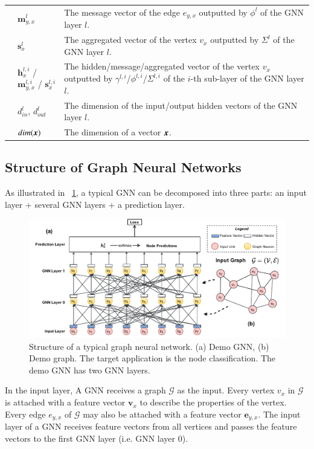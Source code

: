 \begin{table}[h]
\begin{tabular}{p{3em}lp{35em}}
        & $\boldsymbol{m}_{y,x}^l$ & The message vector of the edge $e_{y,x}$ outputted by $\phi^l$ of the GNN layer $l$. \\
        & $\boldsymbol{s}_{x}^l$ & The aggregated vector of the vertex $v_x$ outputted by $\Sigma^l$ of the GNN layer $l$. \\
        & $\boldsymbol{h}_{x}^{l,i}$ / $\boldsymbol{m}_{y,x}^{l,i}$ / $\boldsymbol{s}_{x}^{l,i}$ & The hidden/message/aggregated vector of the vertex $v_x$ outputted by $\gamma^{l,i}$/$\phi^{l,i}$/$\Sigma^{l,i}$ of the $i$-th sub-layer of the GNN layer $l$. \\
        & $d^l_{in}$, $d^l_{out}$ &  The dimension of the input/output hidden vectors of the GNN layer $l$. \\
        & $dim(\boldsymbol{x})$ & The dimension of a vector $\boldsymbol{x}$. \\
        \bottomrule
    \end{tabular}
\end{table}

\subsection{Structure of Graph Neural Networks}

As illustrated in \figurename~\ref{fig:general_structure_of_gnn}, a typical GNN can be decomposed into three parts: an input layer + several GNN layers + a prediction layer.

\begin{figure}[h]
    \centering
    \includegraphics[width=0.95\columnwidth]{figs/illustration/GNN_common_architecture.pdf}
    \caption{Structure of a typical graph neural network. (a) Demo GNN, (b) Demo graph. The target application is the node classification. The demo GNN has two GNN layers.}
    \label{fig:general_structure_of_gnn}
\end{figure}

In the input layer, A GNN receives a graph $\mathcal{G}$ as the input.
%
Every vertex $v_x$ in $\mathcal{G}$ is attached with a feature vector $\boldsymbol{v}_x$ to describe the properties of the vertex.
%
Every edge $e_{y,x}$ of $\mathcal{G}$ may also be attached with a feature vector $\boldsymbol{e}_{y,x}$.
%
The input layer of a GNN receives feature vectors from all vertices and passes the feature vectors to the first GNN layer (i.e. GNN layer 0).

